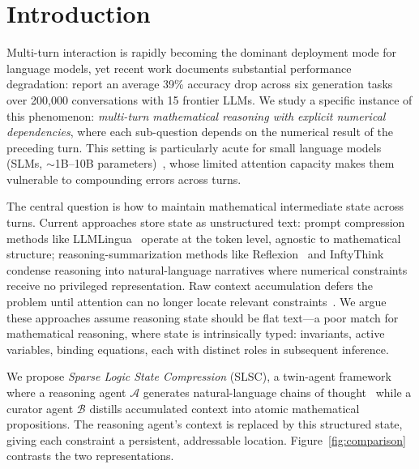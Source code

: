 \section{Introduction}
Multi-turn interaction is rapidly becoming the dominant deployment mode for language models, yet recent work documents substantial performance degradation: \cite{lanban2025lost} report an average 39\% accuracy drop across six generation tasks over 200{,}000 conversations with 15 frontier LLMs. We study a specific instance of this phenomenon: \emph{multi-turn mathematical reasoning with explicit numerical dependencies}, where each sub-question depends on the numerical result of the preceding turn. This setting is particularly acute for small language models (SLMs, $\sim$1B--10B parameters)~\citep{zhang2024tinyllama,abdin2024phi3}, whose limited attention capacity makes them vulnerable to compounding errors across turns.

The central question is how to maintain mathematical intermediate state across turns. Current approaches store state as unstructured text: prompt compression methods like LLMLingua~\citep{jiang2023llmlingua} operate at the token level, agnostic to mathematical structure; reasoning-summarization methods like Reflexion~\citep{shinn2023reflexion} and InftyThink~\citep{yan2025inftythink} condense reasoning into natural-language narratives where numerical constraints receive no privileged representation. Raw context accumulation defers the problem until attention can no longer locate relevant constraints~\citep{liu2024lost}. We argue these approaches assume reasoning state should be flat text---a poor match for mathematical reasoning, where state is intrinsically typed: invariants, active variables, binding equations, each with distinct roles in subsequent inference. 

We propose \emph{Sparse Logic State Compression} (SLSC), a twin-agent framework~\citep{wu2023autogen,yao2023react} where a reasoning agent $\mathcal{A}$ generates natural-language chains of thought~\citep{wei2022chain} while a curator agent $\mathcal{B}$ distills accumulated context into atomic mathematical propositions. The reasoning agent's context is replaced by this structured state, giving each constraint a persistent, addressable location. Figure~\ref{fig:comparison} contrasts the two representations.

